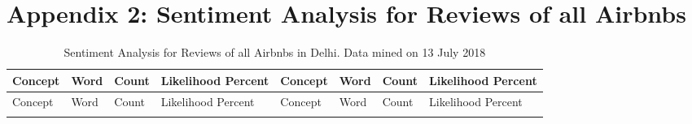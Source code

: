 \documentclass[a4paper, 12pt]{article}
\begin{document}
\begin{longtable}[c]{>{\raggedright}p{5.5cm}>{\raggedright}p{2cm}p{5.5cm}>{\raggedright\arraybackslash}p{2cm}}
\end{longtable}

\newpage






 \section*{Appendix 2: Sentiment Analysis for Reviews of all Airbnbs}

\footnotesize
\begin{longtable}[l]{p{2cm}p{2cm}p{1cm}p{1.6cm}p{2.4cm}p{1.9cm}p{1cm}p{2cm}}
\caption{Sentiment Analysis for Reviews of all Airbnbs in Delhi. Data mined on 13 July 2018} \\
Concept & Word & Count & Likelihood Percent & Concept & Word & Count & Likelihood Percent \\
\midrule
\endfirsthead
Concept & Word & Count & Likelihood Percent & Concept & Word & Count & Likelihood Percent \\
\midrule
\endhead
\endfoot
\endlastfoot


\end{longtable}
\end{document}
